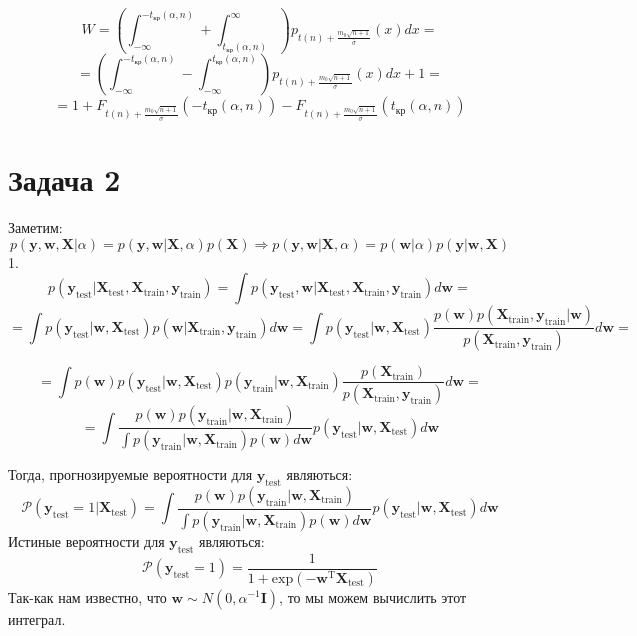 \documentclass[12pt, twoside]{article}
\newcommand{\Pb}{\mathcal{P}}
\begin{document}
$$W = \left(\int_{-\infty}^{-t_{\text{кр}}(\alpha, n)}+\int^{\infty}_{t_{\text{кр}}(\alpha, n)}\right)p_{t(n) + \frac{m_0\sqrt{n+1}}{\bar{\sigma}}}(x)dx = $$
$$=  \left(\int_{-\infty}^{-t_{\text{кр}}(\alpha, n)}-\int_{-\infty}^{t_{\text{кр}}(\alpha, n)}\right)p_{t(n) + \frac{m_0\sqrt{n+1}}{\bar{\sigma}}}(x)dx + 1 = $$
$$= 1 + F_{t(n) +\frac{m_0\sqrt{n+1}}{\bar{\sigma}}}(-{t_{\text{кр}}(\alpha, n)}) - F_{t(n) +\frac{m_0\sqrt{n+1}}{\bar{\sigma}}}({t_{\text{кр}}(\alpha, n)}) $$

\section{Задача 2}
Заметим:
$$p(\textbf{y}, \textbf{w}, \textbf{X}|\alpha) = p(\textbf{y}, \textbf{w}|\textbf{X},\alpha)p(\textbf{X})\Rightarrow p(\textbf{y}, \textbf{w}|\textbf{X},\alpha) = p(\textbf{w}|\alpha)p(\textbf{y}|\textbf{w}, \textbf{X})$$
1. 
$$p(\textbf{y}_\text{test}|\textbf{X}_\text{test}, \textbf{X}_\text{train}, \textbf{y}_\text{train}) = \int p(\textbf{y}_\text{test}, \textbf{w}|\textbf{X}_\text{test}, \textbf{X}_\text{train}, \textbf{y}_\text{train}) d\textbf{w}=$$
$$ = \int p(\textbf{y}_\text{test}|\textbf{w}, \textbf{X}_\text{test})p(\textbf{w}|\textbf{X}_\text{train}, \textbf{y}_\text{train})d\textbf{w} = \int p(\textbf{y}_\text{test}|\textbf{w}, \textbf{X}_\text{test}) \frac{p(\textbf{w})p(\textbf{X}_\text{train}, \textbf{y}_\text{train}| \textbf{w})}{p(\textbf{X}_\text{train}, \textbf{y}_\text{train})}d\textbf{w}=$$

$$= \int p(\textbf{w})p(\textbf{y}_\text{test}|\textbf{w}, \textbf{X}_\text{test})p(\textbf{y}_\text{train}|\textbf{w}, \textbf{X}_\text{train}) \frac{p(\textbf{X}_\text{train})}{p(\textbf{X}_\text{train}, \textbf{y}_\text{train})}d\textbf{w} =$$
$$= \int \frac{p(\textbf{w})p(\textbf{y}_\text{train}|\textbf{w}, \textbf{X}_\text{train}) }{\int p(\textbf{y}_\text{train}| \textbf{w}, \textbf{X}_\text{train})p(\textbf{w})d\textbf{w} }p(\textbf{y}_\text{test}|\textbf{w}, \textbf{X}_\text{test})d\textbf{w}$$

Тогда, прогнозируемые вероятности для $\textbf{y}_\text{test}$ являються:
$$\Pb(\textbf{y}_\text{test} = 1|\textbf{X}_\text{test}) = \int \frac{p(\textbf{w})p(\textbf{y}_\text{train}|\textbf{w}, \textbf{X}_\text{train}) }{\int p(\textbf{y}_\text{train}| \textbf{w}, \textbf{X}_\text{train})p(\textbf{w})d\textbf{w} }p(\textbf{y}_\text{test}|\textbf{w}, \textbf{X}_\text{test})d\textbf{w}$$
Истиные вероятности для $\textbf{y}_\text{test}$ являються:
$$\Pb(\textbf{y}_\text{test} =1) = \frac{1}{1+\text{exp}(-\textbf{w}^\text{T}\textbf{X}_\text{test})}$$
Так-как нам известно, что $\textbf{w} \sim N(0, \alpha^{-1}\textbf{I})$, то мы можем вычислить этот интеграл.
\end{document}
